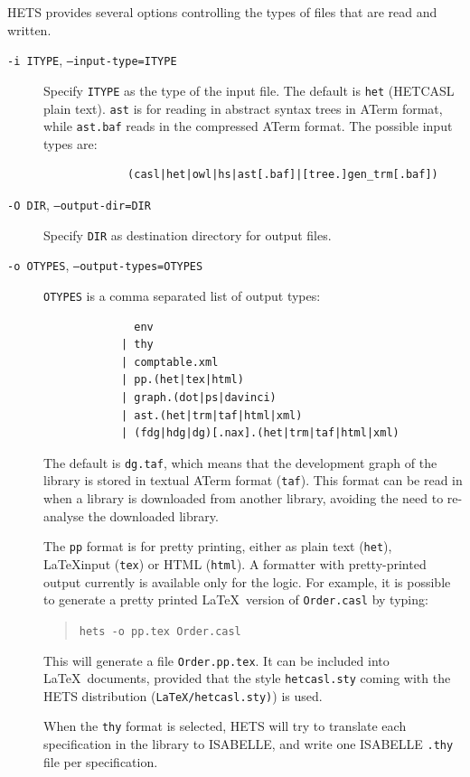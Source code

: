 \documentclass{article}
\newcommand{\normalTEXTSC}[2]{{#1\scriptsize#2}}
\newcommand     {\Hets}{\normalTEXTSC{H}{ETS}\xspace}
\newcommand     {\Isabelle}{\normalTEXTSC{I}{SABELLE}\xspace}
\newcommand{\HetCASL}{\normalTEXTSC{H}{ET}\normalTEXTSC{C}{ASL}\xspace}
\begin{document}
\Hets provides several options controlling the types of files
that are read and written.
\begin{description}
\item[\texttt{-i ITYPE}, \texttt{--input-type=ITYPE}] Specify
\texttt{ITYPE} as the type of the input file.  The default is
\texttt{het} (\HetCASL plain text). \texttt{ast} is for reading
in abstract syntax trees in ATerm format, while \texttt{ast.baf}
reads in the compressed ATerm format.
The possible input types are:
\begin{verbatim}
             (casl|het|owl|hs|ast[.baf]|[tree.]gen_trm[.baf])
\end{verbatim}

\item[\texttt{-O DIR}, \texttt{--output-dir=DIR}] 
Specify \texttt{DIR} as  destination directory for output files.

\item[\texttt{-o OTYPES}, \texttt{--output-types=OTYPES}]  
\texttt{OTYPES} is a comma separated list of output types:
\begin{verbatim}
              env
            | thy
            | comptable.xml
            | pp.(het|tex|html)
            | graph.(dot|ps|davinci)
            | ast.(het|trm|taf|html|xml)
            | (fdg|hdg|dg)[.nax].(het|trm|taf|html|xml)
\end{verbatim}
The default is \texttt{dg.taf}, which means that the development
graph of the library is stored in textual ATerm format (\texttt{taf}).
This format can be read in when a library is downloaded from
another library, avoiding the need to re-analyse the downloaded library.

The \texttt{pp} format is for pretty printing, either as plain text
(\texttt{het}), \LaTeX input (\texttt{tex}) or HTML (\texttt{html}).
A formatter with pretty-printed output currently is available only for
the \CASL logic. For example, it is possible to generate a pretty
printed \LaTeX\ version of \texttt{Order.casl} by typing:

\begin{quote}
\texttt{hets -o pp.tex Order.casl}
\end{quote}

This will generate a file \texttt{Order.pp.tex}. It can be included
into \LaTeX\ documents, provided that the style \texttt{hetcasl.sty}
coming with the \Hets distribution (\texttt{LaTeX/hetcasl.sty)}) is used.

When the \texttt{thy} format is selected, \Hets will try to translate
each specification in the library to \Isabelle, and write one \Isabelle
\texttt{.thy} file per specification.


\end{description}
\end{document}
